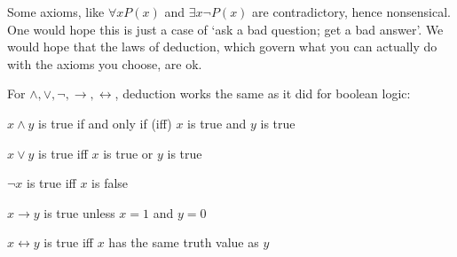 \documentclass{scrbook}
\renewcommand{\implies}{\to}
\renewcommand{\iff}{\leftrightarrow}
\begin{document}
Some axioms, like $\forall x P(x)$ and $\exists x \neg P(x)$ are contradictory, hence nonsensical. One would hope this is just a case of `ask a bad question; get a bad answer'. We would hope that the laws of deduction, which govern what you can actually do with the axioms you choose, are ok. 


For $\wedge,\vee,\neg,\implies,\iff$, deduction works the same as it did for boolean logic:
\begin{trivlist}
\item $x \wedge y$ is true if and only if (iff) $x$ is true and $y$ is true
\item $x \vee y$ is true iff $x$ is true or $y$ is true 
\item $\neg x$ is true iff $x$ is false   
\item $x \implies y$ is true unless $x=1$ and $y=0$  
\item $x\iff y$ is true iff $x$ has the same truth value as $y$  
\end{trivlist}
\end{document}

